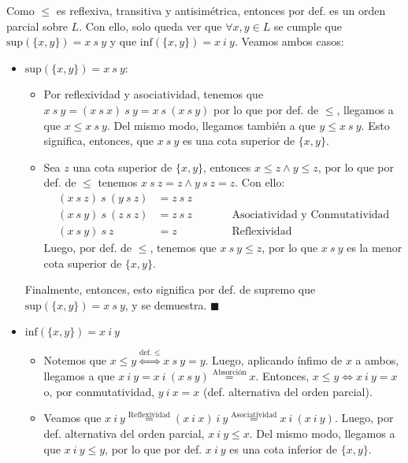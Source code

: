\documentclass{article}
\begin{document}
Como $\leq$ es reflexiva, transitiva y antisimétrica, entonces por def. es un orden parcial sobre $L$. Con ello, solo queda ver que $\forall x,y\in L$ se cumple que $\text{sup}(\{x,y\})=x\ s\ y$ y que $\text{inf}(\{x,y\})=x\ i\ y$. Veamos ambos casos:
\begin{itemize}
  \item $\text{sup}(\{x,y\})=x\ s\ y$:
        \begin{itemize}
          \item Por reflexividad y asociatividad, tenemos que $x\ s\ y=(x\ s\ x)\ s\ y=x\ s\ (x\ s\ y)$ por lo que por def. de $\leq$, llegamos a que $x\leq x\ s\ y$. Del mismo modo, llegamos también a que $y\leq x\ s\ y$. Esto significa, entonces, que $x\ s\ y$ es una cota superior de $\{x,y\}$.
          \item Sea $z$ una cota superior de $\{x,y\}$, entonces $x\leq z\land y\leq z$, por lo que por def. de $\leq$ tenemos $x\ s\ z=z\land y\ s\ z=z$. Con ello:
                \begin{equation*}
                  \begin{aligned}
                    (x\ s\ z)\ s\ (y\ s\ z) & = z\ s\ z &  &                                             \\
                    (x\ s\ y)\ s\ (z\ s\ z) & = z\ s\ z &  & \qquad\text{Asociatividad y Conmutatividad} \\
                    (x\ s\ y)\ s\ z         & =z        &  & \qquad\text{Reflexividad}
                  \end{aligned}
                \end{equation*}
                Luego, por def. de $\leq$, tenemos que $x\ s\ y\leq z$, por lo que $x\ s\ y$ es la menor cota superior de $\{x,y\}$.
        \end{itemize}
        Finalmente, entonces, esto significa por def. de supremo que $\text{sup}(\{x,y\})=x\ s\ y$, y se demuestra. $\blacksquare$
  \item $\text{inf}(\{x,y\})=x\ i\ y$
        \begin{itemize}
          \item Notemos que $x\leq y\overset{\text{def. }\leq}{\iff}x\ s\ y=y$. Luego, aplicando ínfimo de $x$ a ambos, llegamos a que $x\ i\ y=x\ i\ (x\ s\ y)\overset{\text{Absorción}}{=}x$. Entonces, $x\leq y\iff x\ i\ y=x$ o, por conmutatividad, $y\ i\ x=x$ (def. alternativa del orden parcial).
          \item Veamos que $x\ i\ y\overset{\text{Reflexividad}}{=}(x\ i\ x)\ i\ y\overset{\text{Asociatividad}}{=}x\ i\ (x\ i\ y)$. Luego, por def. alternativa del orden parcial, $x\ i\ y\leq x$. Del mismo modo, llegamos a que $x\ i\ y\leq y$, por lo que por def. $x\ i\ y$ es una cota inferior de $\{x,y\}$.

\end{itemize}
\end{itemize}
\end{document}
